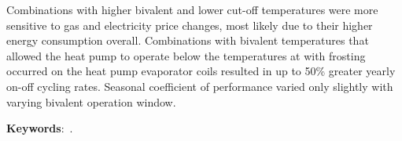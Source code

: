Combinations with higher bivalent and lower cut-off temperatures were more sensitive to gas and electricity price changes, most likely due to their higher energy consumption overall. Combinations with bivalent temperatures that allowed the heat pump to operate below the temperatures at with frosting occurred on the heat pump evaporator coils resulted in up to 50\% greater yearly on-off cycling rates. Seasonal coefficient of performance varied only slightly with varying bivalent operation window.

\bigskip\bigskip\bigskip\bigskip
\textbf{Keywords}:~\mykeywords.



\endgroup

